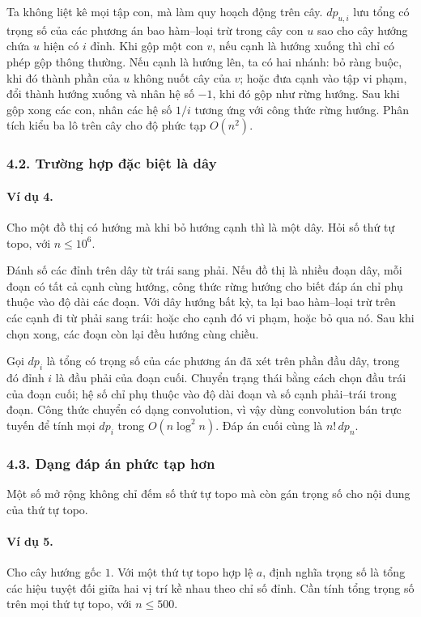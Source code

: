 \documentclass[11pt]{article}
\begin{document}
Ta không liệt kê mọi tập con, mà làm quy hoạch động trên cây. \(dp_{u,i}\) lưu
tổng có trọng số của các phương án bao hàm--loại trừ trong cây con \(u\) sao
cho cây hướng chứa \(u\) hiện có \(i\) đỉnh. Khi gộp một con \(v\), nếu cạnh là
hướng xuống thì chỉ có phép gộp thông thường. Nếu cạnh là hướng lên, ta có hai
nhánh: bỏ ràng buộc, khi đó thành phần của \(u\) không nuốt cây của \(v\); hoặc
đưa cạnh vào tập vi phạm, đổi thành hướng xuống và nhân hệ số \(-1\), khi đó
gộp như rừng hướng. Sau khi gộp xong các con, nhân các hệ số \(1/i\) tương ứng
với công thức rừng hướng. Phân tích kiểu ba lô trên cây cho độ phức tạp
\(O(n^2)\).

\subsubsection*{4.2. Trường hợp đặc biệt là dây}

\paragraph{Ví dụ 4.}
Cho một đồ thị có hướng mà khi bỏ hướng cạnh thì là một dây. Hỏi số thứ tự
topo, với \(n\le 10^6\).

Đánh số các đỉnh trên dây từ trái sang phải. Nếu đồ thị là nhiều đoạn dây, mỗi
đoạn có tất cả cạnh cùng hướng, công thức rừng hướng cho biết đáp án chỉ phụ
thuộc vào độ dài các đoạn. Với dây hướng bất kỳ, ta lại bao hàm--loại trừ trên
các cạnh đi từ phải sang trái: hoặc cho cạnh đó vi phạm, hoặc bỏ qua nó. Sau
khi chọn xong, các đoạn còn lại đều hướng cùng chiều.

Gọi \(dp_i\) là tổng có trọng số của các phương án đã xét trên phần đầu dây,
trong đó đỉnh \(i\) là đầu phải của đoạn cuối. Chuyển trạng thái bằng cách chọn
đầu trái của đoạn cuối; hệ số chỉ phụ thuộc vào độ dài đoạn và số cạnh
phải--trái trong đoạn. Công thức chuyển có dạng convolution, vì vậy dùng
convolution bán trực tuyến để tính mọi \(dp_i\) trong \(O(n\log^2 n)\). Đáp án
cuối cùng là \(n!\,dp_n\).

\subsubsection*{4.3. Dạng đáp án phức tạp hơn}

Một số mở rộng không chỉ đếm số thứ tự topo mà còn gán trọng số cho nội dung của
thứ tự topo.

\paragraph{Ví dụ 5.}
Cho cây hướng gốc \(1\). Với một thứ tự topo hợp lệ \(a\), định nghĩa trọng số
là tổng các hiệu tuyệt đối giữa hai vị trí kề nhau theo chỉ số đỉnh. Cần tính
tổng trọng số trên mọi thứ tự topo, với \(n\le 500\).
\end{document}
